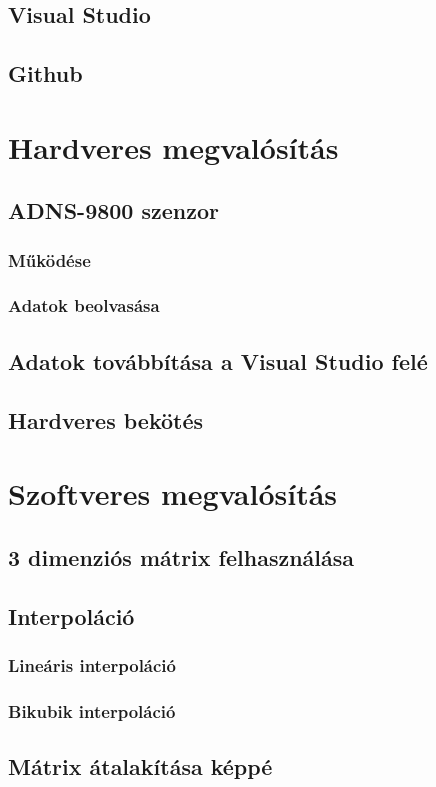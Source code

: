 \documentclass[
]{thesis-ekf}
\theoremstyle{definition}
\theoremstyle{remark}
\begin{document}
\section{Visual Studio}
\section{Github}
\chapter{Hardveres megvalósítás}
\section{ADNS-9800 szenzor}
\subsection{Működése}
\subsection{Adatok beolvasása}
\section{Adatok továbbítása a Visual Studio felé}
\section{Hardveres bekötés}
\chapter{Szoftveres megvalósítás}
\section{3 dimenziós mátrix felhasználása}
\section{Interpoláció}
\subsection{Lineáris interpoláció}
\subsection{Bikubik interpoláció}
\section{Mátrix átalakítása képpé}
\end{document}
